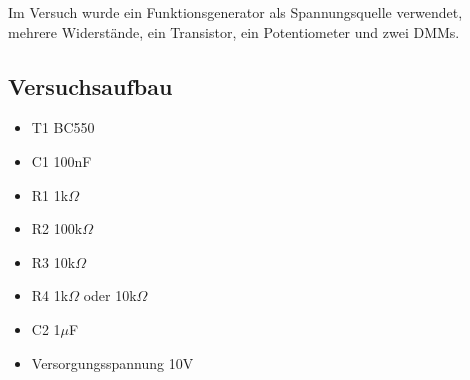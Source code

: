 \documentclass[12pt,a4paper]{article}
\begin{document}
Im Versuch wurde ein Funktionsgenerator als Spannungsquelle verwendet, mehrere Widerstände, ein Transistor, ein Potentiometer und zwei DMMs.

\subsection{Versuchsaufbau}

\begin{itemize}
\item	T1 BC550

\item	C1 100nF

\item	R1 1k$\Omega$

\item	R2 100k$\Omega$

\item	R3 10k$\Omega$

\item	R4 1k$\Omega$ oder 10k$\Omega$

\item	C2 1$\mu$F

\item	Versorgungsspannung 10V
\end{itemize}
\end{document}
